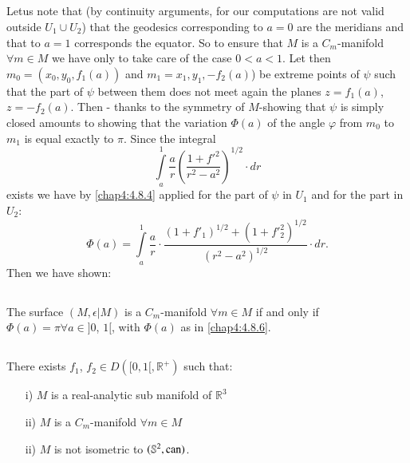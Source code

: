 \setcounter{subsection}{4}
\subsection{}\label{chap4:4.8.5}
Let\pageoriginale us note that (by continuity arguments, for our
computations are not valid outside $U_{1}\cup U_{2}$) that the
geodesics corresponding to $a=0$ are the meridians and that to $a=1$
corresponds the equator. So to ensure that $M$ is a $C_{m}$-manifold
$\forall m\in M$ we have only to take care of the case $0<a<1$. Let
then $m_{0}=(x_{0},y_{0},f_{1}(a))$ and $m_{1}=x_{1},y_{1},-f_{2}(a)$)
be extreme points of $\psi$ such that the part of $\psi$ between them
does not meet again the planes $z=f_{1}(a)$, $z=-f_{2}(a)$. Then -
thanks to the symmetry of $M$-showing that $\psi$ is simply closed
amounts to showing that the variation $\Phi(a)$ of the angle $\varphi$
from $m_{0}$ to $m_{1}$ is equal exactly to $\pi$. Since the integral
$$
\int\limits^{1}_{a}\frac{a}{r}\left(\frac{1+{f'}^{2}}{r^{2}-a^{2}}\right)^{1/2}\cdot
dr
$$
exists we have by \eqref{chap4:4.8.4} applied for the part of $\psi$ in
$U_{1}$ and for the part in $U_{2}$:
\begin{equation*}
\Phi(a)=\int\limits^{1}_{a}\frac{a}{r}\cdot
\frac{(1+f'_{1})^{1/2}+(1+{f'}^{2}_{2})^{1/2}}{(r^{2}-a^{2})^{1/2}}\cdot dr.\tag{4.8.6}\label{chap4:4.8.6}
\end{equation*}
Then we have shown:

\setcounter{subsection}{6}

\subsection{}\label{chap4:4.8.7}

\begin{theorem*}[Darboux]
The surface $(M,\epsilon|M)$ is a $C_{m}$-manifold $\forall m\in M$ if
and only if $\Phi(a)=\pi \forall a\in ]0$, $1[$, with $\Phi(a)$ as in
    \eqref{chap4:4.8.6}. 
\end{theorem*}

\subsection{}\label{chap4:4.8.8}

\begin{theorem*}
There exists $f_{1}$, $f_{2}\in D([0,1[,\mathbb{R}^{+})$ such that:
\begin{itemize}
\item[{\rm i)}] $M$ \pageoriginale is a real-analytic sub manifold of
  $\mathbb{R}^{3}$

\item[{\rm ii)}] $M$ is a $C_{m}$-manifold $\forall m\in M$

\item[{\rm ii)}] $M$ is not isometric to $(\mathbb{S}^{2},\operatorname{can})$.
\end{itemize}
\end{theorem*}

